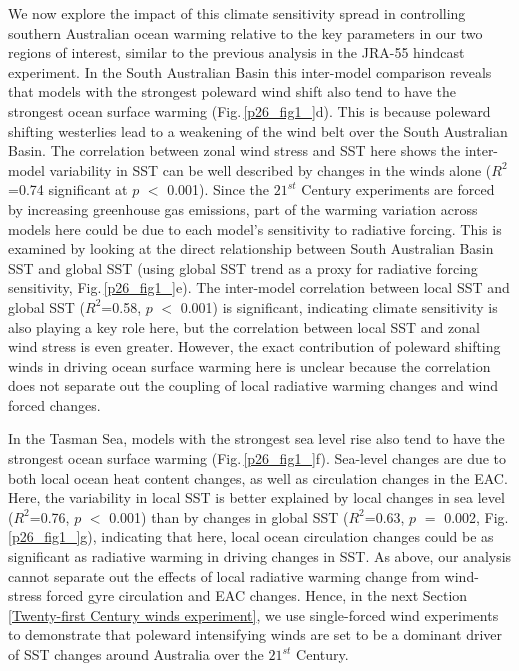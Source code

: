 \documentclass[draft,linenumbers]{agujournal2018}
\begin{document}
We now explore the impact of this climate sensitivity spread in controlling southern Australian ocean warming relative to the key parameters in our two regions of interest, similar to the previous analysis in the JRA-55 hindcast experiment. In the South Australian Basin this inter-model comparison reveals that models with the strongest poleward wind shift also tend to have the strongest ocean surface warming (Fig.\,\ref{p26_fig1_}d). This is because poleward shifting westerlies lead to a weakening of the wind belt over the South Australian Basin. The correlation between zonal wind stress and SST here shows the inter-model variability in SST can be well described by changes in the winds alone ($R^2$=0.74 significant at $p$ $<$ 0.001). Since the $21^{st}$ Century experiments are forced by increasing greenhouse gas emissions, part of the warming variation across models here could be due to each model's sensitivity to radiative forcing. This is examined by looking at the direct relationship between South Australian Basin SST and global SST (using global SST trend as a proxy for radiative forcing sensitivity, Fig.\,\ref{p26_fig1_}e). The inter-model correlation between local SST and global SST ($R^2$=0.58, $p$ $<$ 0.001) is significant, indicating climate sensitivity is also playing a key role here, but the correlation between local SST and zonal wind stress is even greater. However, the exact contribution of poleward shifting winds in driving ocean surface warming here is unclear because the correlation does not separate out the coupling of local radiative warming changes and wind forced changes.

In the Tasman Sea, models with the strongest sea level rise also tend to have the strongest ocean surface warming (Fig.\,\ref{p26_fig1_}f). Sea-level changes are due to both local ocean heat content changes, as well as circulation changes in the EAC. Here, the variability in local SST is better explained by local changes in sea level ($R^2$=0.76, $p$ $<$ 0.001) than by changes in global SST ($R^2$=0.63, $p$ $=$ 0.002, Fig.\,\ref{p26_fig1_}g), indicating that here, local ocean circulation changes could be as significant as radiative warming in driving changes in SST. As above, our analysis cannot separate out the effects of local radiative warming change from wind-stress forced gyre circulation and EAC changes. Hence, in the next Section\,\ref{Twenty-first Century winds experiment}, we use single-forced wind experiments to demonstrate that poleward intensifying winds are set to be a dominant driver of SST changes around Australia over the $21^{st}$ Century.
\end{document}
